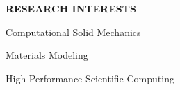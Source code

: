 \documentclass[11pt]{article}
\newlength{\sectionskip} \setlength{\sectionskip}{0.2in}
\newlength{\listskip} \setlength{\listskip}{0.05in}
\newlength{\minipagewidth} \setlength{\minipagewidth}{6.25in} %
\newlength{\myparindent} \setlength{\myparindent}{0.25in}
\begin{document}
\vspace{\sectionskip}
\noindent
{\large \textbf{RESEARCH INTERESTS}}
\vspace{\sectionskip}

\begin{minipage}{\minipagewidth}
Computational Solid Mechanics

\vspace{\listskip}
Materials Modeling

\vspace{\listskip}
High-Performance Scientific Computing
\end{minipage}\vspace{\parskip}

%

%



%


%

\vspace{-0.1in}

\begin{bibunit}[unsrtnat]
  \renewcommand{\refname}{{\large PEER-REVIEWED JOURNAL ARTICLES}}
  \nocite{*}
\end{bibunit}

\vspace{-0.1in}
\end{document}
